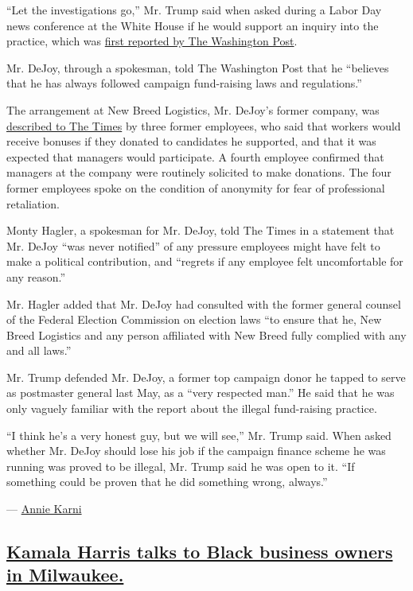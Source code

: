 ``Let the investigations go,'' Mr. Trump said when asked during a Labor
Day news conference at the White House if he would support an inquiry
into the practice, which was
\href{https://www.washingtonpost.com/investigations/louis-dejoy-campaign-contributions/2020/09/06/1187bc2c-e3fe-11ea-8181-606e603bb1c4_story.html}{first
reported by The Washington Post}.

Mr. DeJoy, through a spokesman, told The Washington Post that he
``believes that he has always followed campaign fund-raising laws and
regulations.''

The arrangement at New Breed Logistics, Mr. DeJoy's former company, was
\href{https://www.nytimes3xbfgragh.onion/2020/09/06/us/politics/dejoy-political-donations.html?searchResultPosition=1}{described
to The Times} by three former employees, who said that workers would
receive bonuses if they donated to candidates he supported, and that it
was expected that managers would participate. A fourth employee
confirmed that managers at the company were routinely solicited to make
donations. The four former employees spoke on the condition of anonymity
for fear of professional retaliation.

Monty Hagler, a spokesman for Mr. DeJoy, told The Times in a statement
that Mr. DeJoy ``was never notified'' of any pressure employees might
have felt to make a political contribution, and ``regrets if any
employee felt uncomfortable for any reason.''

Mr. Hagler added that Mr. DeJoy had consulted with the former general
counsel of the Federal Election Commission on election laws ``to ensure
that he, New Breed Logistics and any person affiliated with New Breed
fully complied with any and all laws.''

Mr. Trump defended Mr. DeJoy, a former top campaign donor he tapped to
serve as postmaster general last May, as a ``very respected man.'' He
said that he was only vaguely familiar with the report about the illegal
fund-raising practice.

``I think he's a very honest guy, but we will see,'' Mr. Trump said.
When asked whether Mr. DeJoy should lose his job if the campaign finance
scheme he was running was proved to be illegal, Mr. Trump said he was
open to it. ``If something could be proven that he did something wrong,
always.''

--- \href{https://www.nytimes3xbfgragh.onion/by/annie-karni}{Annie
Karni}

\hypertarget{kamala-harris-talks-to-black-business-owners-in-milwaukee}{%
\subsection{\texorpdfstring{\protect\hyperlink{kamala-harris-talks-to-black-business-owners-in-milwaukee}{Kamala
Harris talks to Black business owners in
Milwaukee.}}{Kamala Harris talks to Black business owners in Milwaukee.}}\label{kamala-harris-talks-to-black-business-owners-in-milwaukee}}

